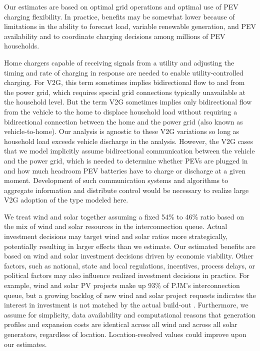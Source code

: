 \documentclass[9pt,twocolumn,twoside,lineno]{pnas-new}
\begin{document}
Our estimates are based on optimal grid operations and optimal use of PEV charging flexibility. In practice, benefits may be somewhat lower because of limitations in the ability to forecast load, variable renewable generation, and PEV availability and to coordinate charging decisions among millions of PEV households. 

Home chargers capable of receiving signals from a utility and adjusting the timing and rate of charging in response are needed to enable utility-controlled charging. For V2G, this term sometimes implies bidirectional flow to and from the power grid, which requires special grid connections typically unavailable at the household level. But the term V2G sometimes implies only bidirectional flow from the vehicle to the home to displace household load without requiring a bidirectional connection between the home and the power grid (also known as vehicle-to-home). Our analysis is agnostic to these V2G variations so long as household load exceeds vehicle discharge in the analysis. However, the V2G cases that we model implicitly assume bidirectional communication between the vehicle and the power grid, which is needed to determine whether PEVs are plugged in and how much headroom PEV batteries have to charge or discharge at a given moment. Development of such communication systems and algorithms to aggregate information and distribute control would be necessary to realize large V2G adoption of the type modeled here.

We treat wind and solar together assuming a fixed 54\% to 46\% ratio based on the mix of wind and solar resources in the interconnection queue. Actual investment decisions may target wind and solar ratios more strategically, potentially resulting in larger effects than we estimate. Our estimated benefits are based on wind and solar investment decisions driven by economic viability. Other factors, such as national, state and local regulations, incentives, process delays, or political factors may also influence realized investment decisions in practice. For example, wind and solar PV projects make up 93\% of PJM's interconnection queue, but a growing backlog of new wind and solar project requests indicates the interest in investment is not matched by the actual build-out \cite{silverman_outlook_2024}.  %
Furthermore, we assume for simplicity, data availability and computational reasons that generation profiles and expansion costs are identical across all wind and across all solar generators, regardless of location. Location-resolved values could improve upon our estimates.
\end{document}

